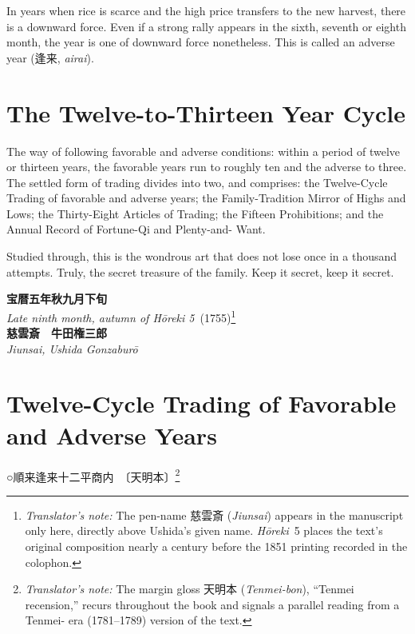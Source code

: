 \documentclass[10pt, openany]{book}
\newcommand{\jp}[1]{{\japanesefont #1}}
\newcommand{\tn}[1]{\footnote{\textit{Translator's note:} #1}}
\newcommand{\jt}[2]{\jp{#1} (\textit{#2})}
\begin{document}
In years when rice is scarce and the high price transfers to the
new harvest, there is a downward force. Even if a strong rally
appears in the sixth, seventh or eighth month, the year is one of
downward force nonetheless. This is called an adverse year
(\jp{逢来}, \textit{airai}).

\section{The Twelve-to-Thirteen Year Cycle}

The way of following favorable and adverse conditions: within a
period of twelve or thirteen years, the favorable years run to
roughly ten and the adverse to three. The settled form of trading
divides into two, and comprises: the Twelve-Cycle Trading of
favorable and adverse years; the Family-Tradition Mirror of Highs
and Lows; the Thirty-Eight Articles of Trading; the Fifteen
Prohibitions; and the Annual Record of Fortune-Qi and Plenty-and-
Want.

Studied through, this is the wondrous art that does not lose once
in a thousand attempts. Truly, the secret treasure of the family.
Keep it secret, keep it secret.

\vspace{0.5em}
\begin{center}
\textbf{\jp{宝暦五年秋九月下旬}}\\[0.2em]
\textit{Late ninth month, autumn of H\=oreki 5}~(1755)\tn{The
pen-name \jt{慈雲斎}{Jiunsai} appears in the manuscript only here,
directly above Ushida's given name. \textit{H\=oreki}~5 places the
text's original composition nearly a century before the 1851
printing recorded in the colophon.}\\[0.6em]
\textbf{\jp{慈雲斎　牛田権三郎}}\\[0.2em]
\textit{Jiunsai, Ushida Gonzabur\=o}
\end{center}
\vspace{0.5em}

\section{Twelve-Cycle Trading of Favorable and Adverse Years}

\begin{center}
\jp{○順来逢来十二平商内　〔天明本〕}\tn{The margin gloss
\jp{天明本} (\textit{Tenmei-bon}), ``Tenmei recension,'' recurs
throughout the book and signals a parallel reading from a Tenmei-
era (1781--1789) version of the text.}
\end{center}
\end{document}
